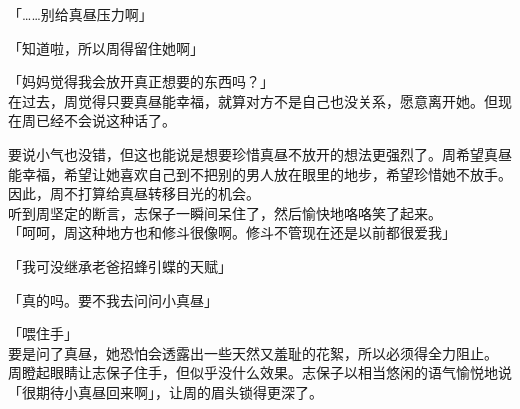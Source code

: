 「……别给真昼压力啊」

「知道啦，所以周得留住她啊」

「妈妈觉得我会放开真正想要的东西吗？」\\

在过去，周觉得只要真昼能幸福，就算对方不是自己也没关系，愿意离开她。但现在周已经不会说这种话了。

要说小气也没错，但这也能说是想要珍惜真昼不放开的想法更强烈了。周希望真昼能幸福，希望让她喜欢自己到不把别的男人放在眼里的地步，希望珍惜她不放手。\\

因此，周不打算给真昼转移目光的机会。\\

听到周坚定的断言，志保子一瞬间呆住了，然后愉快地咯咯笑了起来。\\

「呵呵，周这种地方也和修斗很像啊。修斗不管现在还是以前都很爱我」

「我可没继承老爸招蜂引蝶的天赋」

「真的吗。要不我去问问小真昼」

「喂住手」\\

要是问了真昼，她恐怕会透露出一些天然又羞耻的花絮，所以必须得全力阻止。\\

周瞪起眼睛让志保子住手，但似乎没什么效果。志保子以相当悠闲的语气愉悦地说「很期待小真昼回来啊」，让周的眉头锁得更深了。
